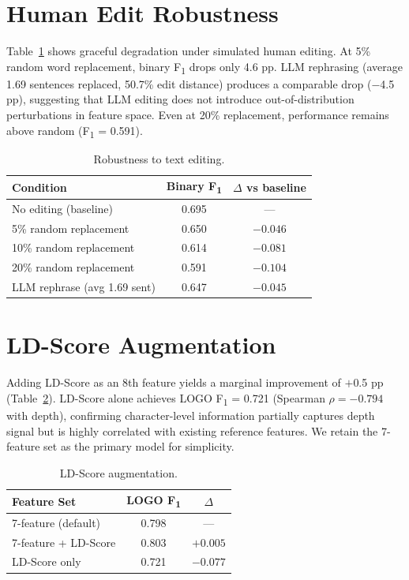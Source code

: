 \documentclass[11pt,a4paper]{article}
\newcommand{\fone}{F\textsubscript{1}}
\newcommand{\rhosp}{\rho}
\begin{document}
\section{Human Edit Robustness}
\label{app:edit}

Table~\ref{tab:edit} shows graceful degradation under simulated human editing.
At 5\% random word replacement, binary \fone{} drops only 4.6 pp.
LLM rephrasing (average 1.69 sentences replaced, 50.7\% edit distance) produces a comparable drop ($-$4.5 pp),
suggesting that LLM editing does not introduce out-of-distribution perturbations in feature space.
Even at 20\% replacement, performance remains above random (\fone{} = 0.591).

\begin{table}[h]
\centering
\caption{Robustness to text editing.}
\label{tab:edit}
\begin{tabular}{lcc}
\toprule
\textbf{Condition} & \textbf{Binary \fone{}} & $\Delta$ \textbf{vs baseline} \\
\midrule
No editing (baseline) & 0.695 & --- \\
5\% random replacement & 0.650 & $-0.046$ \\
10\% random replacement & 0.614 & $-0.081$ \\
20\% random replacement & 0.591 & $-0.104$ \\
LLM rephrase (avg 1.69 sent) & 0.647 & $-0.045$ \\
\bottomrule
\end{tabular}
\end{table}

\section{LD-Score Augmentation}
\label{app:ld}

Adding LD-Score as an 8th feature yields a marginal improvement of $+$0.5 pp (Table~\ref{tab:ld}).
LD-Score alone achieves LOGO \fone{} = 0.721 (Spearman $\rhosp = -0.794$ with depth),
confirming character-level information partially captures depth signal but is highly correlated with existing reference features.
We retain the 7-feature set as the primary model for simplicity.

\begin{table}[h]
\centering
\caption{LD-Score augmentation.}
\label{tab:ld}
\begin{tabular}{lcc}
\toprule
\textbf{Feature Set} & \textbf{LOGO \fone{}} & $\Delta$ \\
\midrule
7-feature (default) & 0.798 & --- \\
7-feature + LD-Score & 0.803 & $+0.005$ \\
LD-Score only & 0.721 & $-0.077$ \\
\bottomrule
\end{tabular}
\end{table}
\end{document}
